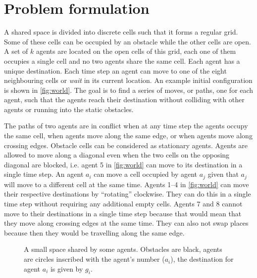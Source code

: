 \section{Problem formulation}\label{sec:problem}
A shared space is divided into discrete cells such that it forms a regular
grid. Some of these cells can be occupied by an obstacle while the other cells
are open. A set of $k$ agents are located on the open cells of this grid, each
one of them occupies a single cell and no two agents share the same cell. Each
agent has a unique destination. Each time step an agent can move to one of the
eight neighbouring cells or \emph{wait} in its current location. An example
initial configuration is shown in \autoref{fig:world}. The goal is to find a
series of moves, or paths, one for each agent, such that the agents reach
their destination without colliding with other agents or running into the
static obstacles.

The paths of two agents are in conflict when at any time step the agents occupy
the same cell, when agents move along the same edge, or when agents move along
crossing edges. Obstacle cells can be considered as stationary agents. Agents
are allowed to move along a diagonal even when the two cells on the opposing
diagonal are blocked, i.e. agent 5 in \autoref{fig:world} can move to its
destination in a single time step. An agent $a_i$ can move a cell occupied by
agent $a_j$ given that $a_j$ will move to a different cell at the same time.
Agents 1--4 in \autoref{fig:world} can move their respective destinations
by ``rotating'' clockwise. They can do this in a single time step without
requiring any additional empty cells. Agents 7 and 8 cannot move to their
destinations in a single time step because that would mean that they move along
crossing edges at the same time. They can also not swap places because then
they would be travelling along the same edge.

\begin{figure}[h]
    \centering
    \def\svgscale{.7}
    
    \caption{A small space shared by some agents. Obstacles are black, agents
        are circles inscribed with the agent's number ($a_i$), the destination 
        for
        agent $a_i$ is given by $g_i$.}
    \label{fig:world}
\end{figure}
